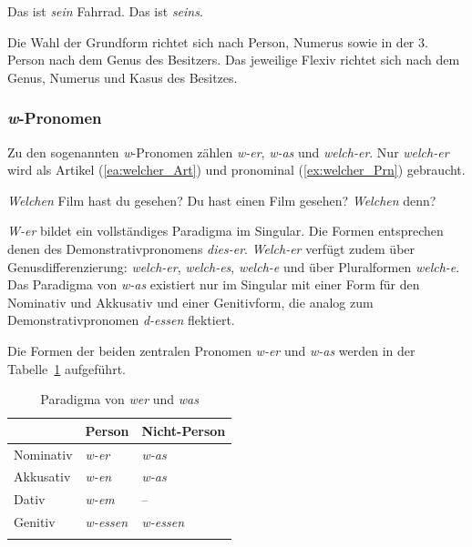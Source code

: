 \ea \label{ea:Poss_Art_Prn}
\ea \label{ea:Poss_Art_sein} Das ist \textit{sein} Fahrrad.
\ex \label{ex:Poss_Prn_seins} Das ist \textit{seins}.
\z 
\z 

Die Wahl der Grundform richtet sich nach Person, Numerus sowie in der 3. Person nach dem Genus des Besitzers. Das jeweilige Flexiv richtet sich nach dem Genus, Numerus und Kasus des Besitzes.


\subsubsection{\textit{w}-Pronomen}\label{subsubsection:W_Pronomen}

Zu den sogenannten \textit{w}-Pronomen zählen \textit{w-er}, \textit{w-as} und \textit{welch-er}. Nur \textit{welch-er} wird als Artikel (\ref{ea:welcher_Art}) und pronominal (\ref{ex:welcher_Prn}) gebraucht.

\ea \label{ea:welcher_Art_Prn}
\ea \label{ea:welcher_Art} \textit{Welchen} Film hast du gesehen?
\ex \label{ex:welcher_Prn} Du hast einen Film gesehen? \textit{Welchen} denn?
\z 
\z 

\textit{W-er} bildet ein vollständiges Paradigma im Singular. Die Formen entsprechen denen des Demonstrativpronomens \textit{dies-er}. \textit{Welch-er} verfügt zudem über Genusdifferenzierung: \textit{welch-er}, \textit{welch-es}, \textit{welch-e} und über Pluralformen \textit{welch-e}. Das Paradigma von \textit{w-as} existiert nur im Singular mit einer Form für den Nominativ und Akkusativ und einer Genitivform, die analog zum Demonstrativpronomen \textit{d-essen} flektiert. 

Die Formen der beiden zentralen Pronomen \textit{w-er} und \textit{w-as} werden in der Tabelle~\ref{tab:wer_was} aufgeführt.

\begin{table}
  \centering
  \begin{tabular}{l l l}
    \lsptoprule
    & Person & Nicht-Person \\
    \hline
    Nominativ & \textit{w-er} & \textit{w-as} \\
    
    Akkusativ & \textit{w-en} & \textit{w-as}  \\
    
    Dativ & \textit{w-em} & -- \\
    
    Genitiv & \textit{w-essen} & \textit{w-essen} \\
    \lspbottomrule 
  \end{tabular}
  \caption{Paradigma von \textit{wer} und \textit{was}}
  \label{tab:wer_was}
\end{table}

